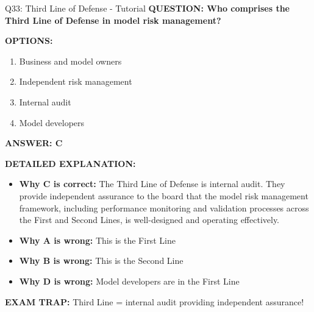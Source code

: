 \documentclass[8pt]{beamer}
\begin{document}
	\begin{frame}{Q33: Third Line of Defense - Tutorial}
		\fontsize{6.5}{7.5}\selectfont
		\textbf{QUESTION: Who comprises the Third Line of Defense in model risk management?}
		
		\vspace{0.1cm}
		\textbf{OPTIONS:}
		\begin{enumerate}
			\item Business and model owners
			\item Independent risk management
			\item Internal audit
			\item Model developers
		\end{enumerate}
		
		\vspace{0.1cm}
		\textcolor{myblue}{\textbf{ANSWER: C}}
		
		\vspace{0.1cm}
		\textbf{DETAILED EXPLANATION:}
		\begin{itemize}
			\item \textbf{Why C is correct:} The Third Line of Defense is internal audit. They provide independent assurance to the board that the model risk management framework, including performance monitoring and validation processes across the First and Second Lines, is well-designed and operating effectively.
			\item \textbf{Why A is wrong:} This is the First Line
			\item \textbf{Why B is wrong:} This is the Second Line
			\item \textbf{Why D is wrong:} Model developers are in the First Line
		\end{itemize}
		
		\textcolor{myred}{\textbf{EXAM TRAP:}} Third Line = \textcolor{myblue}{internal audit} providing independent assurance!
	\end{frame}
	
\end{document}
